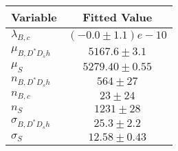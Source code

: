 \begin{tabular}[t]{lc}
\hline
Variable &Fitted Value\\
\hline\hline
$\lambda_{B,c}$&$(-0.0\pm1.1)e-10$\\
\hline
$\mu_{B, D^* D_s h}$&$5167.6\pm3.1$\\
\hline
$\mu_S$&$5279.40\pm0.55$\\
\hline
$n_{B, D^* D_s h}$&$564\pm27$\\
\hline
$n_{B,c}$&$23\pm24$\\
\hline
$n_S$&$1231\pm28$\\
\hline
$\sigma_{B, D^* D_s h}$&$25.3\pm2.2$\\
\hline
$\sigma_S$&$12.58\pm0.43$\\
\hline
\end{tabular}